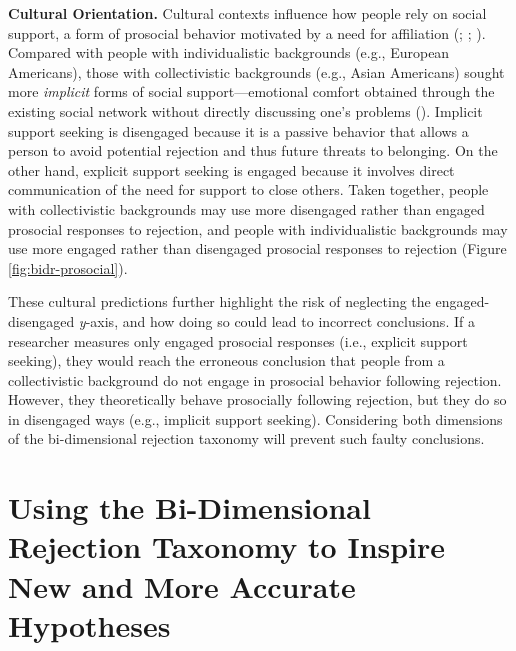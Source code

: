 \documentclass[
]{udthesis}
\begin{document}
\textbf{Cultural Orientation.} Cultural contexts influence how people rely on
social support, a form of prosocial behavior motivated by a need for
affiliation (; ; ).
Compared with people with individualistic backgrounds (e.g., European
Americans), those with collectivistic backgrounds (e.g., Asian
Americans) sought more \emph{implicit} forms of social support---emotional
comfort obtained through the existing social network without directly
discussing one's problems (). Implicit
support seeking is disengaged because it is a passive behavior that
allows a person to avoid potential rejection and thus future threats to
belonging. On the other hand, explicit support seeking is engaged
because it involves direct communication of the need for support to
close others. Taken together, people with collectivistic backgrounds may
use more disengaged rather than engaged prosocial responses to
rejection, and people with individualistic backgrounds may use more
engaged rather than disengaged prosocial responses to rejection (Figure
\ref{fig:bidr-prosocial}).

These cultural predictions further highlight the risk of neglecting the
engaged-disengaged \emph{y}-axis, and how doing so could lead to incorrect
conclusions. If a researcher measures only engaged prosocial responses
(i.e., explicit support seeking), they would reach the erroneous
conclusion that people from a collectivistic background do not engage in
prosocial behavior following rejection. However, they theoretically
behave prosocially following rejection, but they do so in disengaged
ways (e.g., implicit support seeking). Considering both dimensions of
the bi-dimensional rejection taxonomy will prevent such faulty
conclusions.

\section{Using the Bi-Dimensional Rejection Taxonomy to Inspire New and More Accurate Hypotheses}\label{using-the-bi-dimensional-rejection-taxonomy-to-inspire-new-and-more-accurate-hypotheses}
\end{document}
